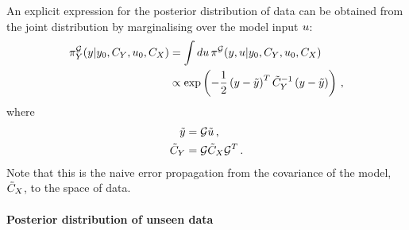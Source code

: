 An explicit expression for the posterior distribution of data can be obtained
from the joint distribution by marginalising over the model input $u$:
\begin{align}
  \label{eq:PosteriorDataSpace}
  \pi_{Y}^{\mathcal{G}}(y|y_0,C_{Y},u_0,C_X)
  &= \int du\, 
  \pi^{\mathcal{G}}(y,u|y_0,C_{Y},u_0,C_X) \\
  &\propto \exp\left(
    -\frac12 \left(y - \tilde{y}\right)^T \tilde{C}_Y^{-1}
    \left(y - \tilde{y}\right)
  \right)\, ,
\end{align}
where
\begin{align}
  \label{eq:PosteriorDataParamsMean}
  \tilde{y} &= \mathcal{G} \tilde{u}\, , \\
  \label{eq:PosteriorDataParamsCov}
  \tilde{C}_Y &= \mathcal{G} \tilde{C}_X \mathcal{G}^T\, .
\end{align}
Note that this is the naive error propagation from the covariance of the model,
$\tilde{C}_X$, to the space of data. 

\paragraph{Posterior distribution of unseen data}

